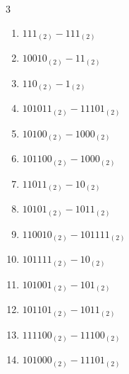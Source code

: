 \begin{multicols}{3}
\begin{enumerate}
  \item $111_{(2)} - 111_{(2)}$


  \item $10010_{(2)} - 11_{(2)}$


  \item $110_{(2)} - 1_{(2)}$


  \item $101011_{(2)} - 11101_{(2)}$


  \item $10100_{(2)} - 1000_{(2)}$


  \item $101100_{(2)} - 1000_{(2)}$


  \item $11011_{(2)} - 10_{(2)}$


  \item $10101_{(2)} - 1011_{(2)}$


  \item $110010_{(2)} - 101111_{(2)}$


  \item $101111_{(2)} - 10_{(2)}$


\columnbreak %

\resetques

  \item $101001_{(2)} - 101_{(2)}$


  \item $101101_{(2)} - 1011_{(2)}$


  \item $111100_{(2)} - 11100_{(2)}$


  \item $101000_{(2)} - 11101_{(2)}$


\end{enumerate}
\end{multicols}
